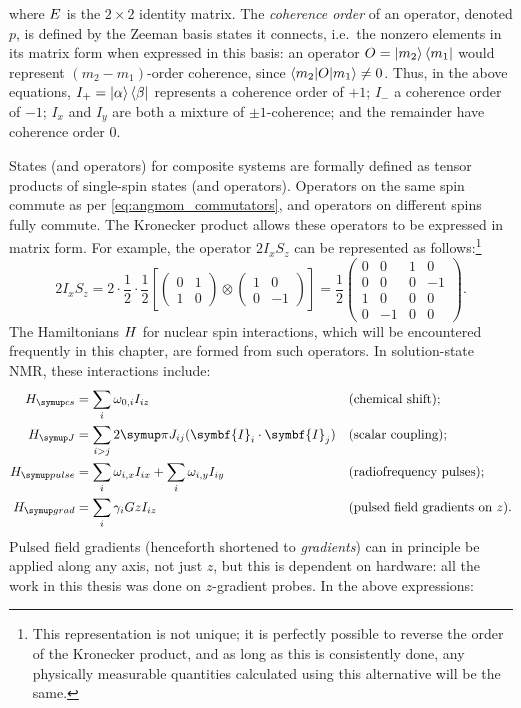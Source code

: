 where $E\/$ is the $2 \times 2$ identity matrix.
The \textit{coherence order} of an operator, denoted $p$, is defined by the Zeeman basis states it connects, i.e.\ the nonzero elements in its matrix form when expressed in this basis: an operator $O = \ket{m_2}\bra{m_1}$ would represent $(m_2 - m_1)$-order coherence, since $\braket{m_2|O|m_1} \neq 0$.
Thus, in the above equations, $I_+ = \ket{\alpha}\bra{\beta}$ represents a coherence order of $+1$; $I_-$ a coherence order of $-1$; $I_x$ and $I_y$ are both a mixture of $\pm 1$-coherence; and the remainder have coherence order $0$.

States (and operators) for composite systems are formally defined as tensor products of single-spin states (and operators)\autocite{Sakurai2021}.
Operators on the same spin commute as per \cref{eq:angmom_commutators}, and operators on different spins fully commute.
The Kronecker product allows these operators to be expressed in matrix form.\autocite{Hore2015}
For example, the operator $2I_xS_z$ can be represented as follows:\footnote{This representation is not unique; it is perfectly possible to reverse the order of the Kronecker product, and as long as this is consistently done, any physically measurable quantities calculated using this alternative will be the same.}
\begin{equation}
    \label{eq:composite_operator}
    2I_xS_z = 2 \cdot \frac{1}{2} \cdot \frac{1}{2} \left[ 
    \begin{pmatrix} 0 & 1 \\ 1 & 0 \end{pmatrix} \otimes
    \begin{pmatrix} 1 & 0 \\ 0 & -1 \end{pmatrix} \right]
    = \frac{1}{2} \begin{pmatrix} 0 & 0 & 1 & 0 \\ 0 & 0 & 0 & -1 \\ 1 & 0 & 0 & 0 \\ 0 & -1 & 0 & 0 \end{pmatrix}.
\end{equation}
The Hamiltonians $H\/$ for nuclear spin interactions, which will be encountered frequently in this chapter, are formed from such operators.\autocite{Levitt2008}
In solution-state NMR, these interactions include:
\begin{align}
    \Hcs &= \sum_i \omega_{0,i} I_{iz} & &\text{(chemical shift)}; \label{eq:h_cs} \\
    \HJ &= \sum_{i > j} 2\cpi J_{ij} (\symbf{I}_{i}\cdot \symbf{I}_{j}) & &\text{(scalar coupling)}; \label{eq:h_j} \\
    \Hpulse &= \sum_i \omega_{i,x}I_{ix} + \sum_i \omega_{i,y}I_{iy} & &\text{(radiofrequency pulses)}; \label{eq:h_pulse} \\
    \Hgrad &= \sum_i \gamma_i Gz I_{iz} & &\text{(pulsed field gradients on }z\text{)}. \label{eq:h_grad}
\end{align}
Pulsed field gradients (henceforth shortened to \textit{gradients}) can in principle be applied along any axis, not just $z$, but this is dependent on hardware: all the work in this thesis was done on $z$-gradient probes.
In the above expressions:

